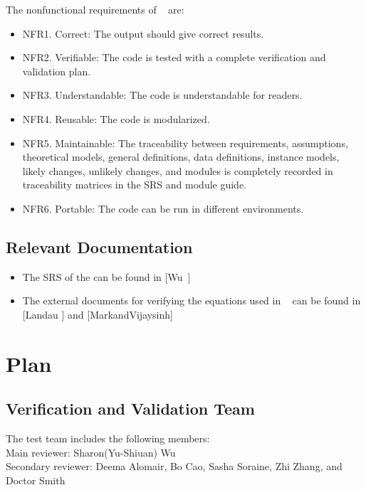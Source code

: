 \documentclass[12pt, titlepage]{article}
\begin{document}
The nonfunctional requirements  of  \progname~ are: 
\begin{itemize} 
\item[ ]NFR1. Correct: The output should give correct results.
\item[ ]NFR2. Verifiable: The code is tested with a complete verification and validation 
plan.
\item[ ]NFR3. Understandable: The code is understandable for readers. 
\item[ ]NFR4. Reusable: The code is modularized.
\item[ ]NFR5. Maintainable: The traceability between requirements, assumptions,
theoretical models, general definitions, data definitions, instance models,
likely changes, unlikely changes, and modules is completely recorded in
traceability matrices in the SRS and module guide.
\item[ ]NFR6. Portable: The code can be run in different environments.
\end{itemize}


\subsection{Relevant Documentation}\label{RD}

\begin{itemize} 
\item[ ]The SRS of the \progname can be found in [Wu~\cite{YS2019}] 
\item[ ]The external documents for verifying the equations used in \progname~
can be found in [Landau ] \cite{Charles2001} and
[MarkandVijaysinh] \cite{JacobsonandJadhav} 

 \end{itemize} 

 \section{Plan}	
\subsection{Verification and Validation Team} The test team includes the
following members:\\ 
Main reviewer: Sharon(Yu-Shiuan) Wu\\ 
Secondary reviewer: Deema Alomair, Bo Cao, Sasha Soraine, Zhi Zhang, 
and Doctor Smith\\
\end{document}
